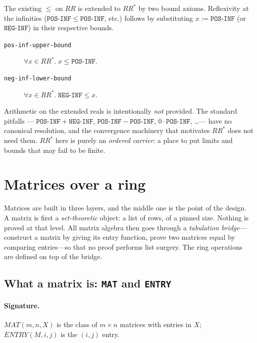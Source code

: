 The existing $\le$ on $\mathit{RR}$ is extended to $\mathit{RR}^{*}$ by
two bound axioms.  Reflexivity at the infinities ($\mathtt{POS\text{-}INF}
\le \mathtt{POS\text{-}INF}$, etc.) follows by substituting
$x := \mathtt{POS\text{-}INF}$ (or $\mathtt{NEG\text{-}INF}$) in their
respective bounds.
\begin{description}
\item[\texttt{pos-inf-upper-bound}]
  $\forall x \in \mathit{RR}^{*}.\; x \le \mathtt{POS\text{-}INF}.$
\item[\texttt{neg-inf-lower-bound}]
  $\forall x \in \mathit{RR}^{*}.\; \mathtt{NEG\text{-}INF} \le x.$
\end{description}

\begin{remark}
Arithmetic on the extended reals is intentionally \emph{not} provided.
The standard pitfalls --- $\mathtt{POS\text{-}INF} + \mathtt{NEG\text{-}INF}$,
$\mathtt{POS\text{-}INF} - \mathtt{POS\text{-}INF}$,
$0 \cdot \mathtt{POS\text{-}INF}$, \ldots --- have no canonical
resolution, and the convergence machinery that motivates
$\mathit{RR}^{*}$ does not need them.  $\mathit{RR}^{*}$ here is purely
an \emph{ordered carrier}: a place to put limits and bounds that may
fail to be finite.
\end{remark}

\section{Matrices over a ring}
\label{sec:matrices}

Matrices are built in three layers, and the middle one is the point of
the design.  A matrix is first a \emph{set-theoretic} object: a list of
rows, of a pinned size.  Nothing is proved at that level.  All matrix
algebra then goes through a \emph{tabulation bridge}---construct a
matrix by giving its entry function, prove two matrices equal by
comparing entries---so that no proof performs list surgery.  The ring
operations are defined on top of the bridge.

\subsection{What a matrix is: \texttt{MAT} and \texttt{ENTRY}}

\paragraph{Signature.}
$\mathit{MAT}(m, n, X)$ is the class of $m \times n$ matrices with
entries in $X$; $\mathit{ENTRY}(M, i, j)$ is the $(i,j)$ entry.

